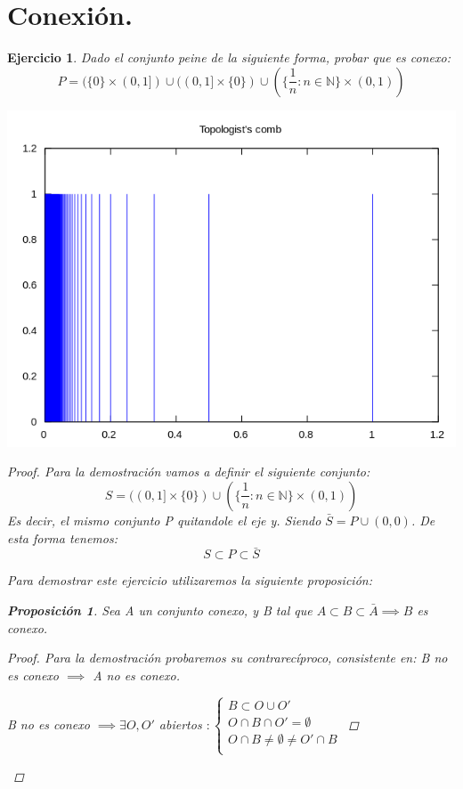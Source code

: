 \documentclass[11pt, a4paper, titlepage]{article}
\theoremstyle{exercise-style}
\newtheorem*{ejer}{Ejercicio}
\theoremstyle{theorem-style}
\newtheorem*{nprop}{Proposición}
\begin{document}
\section{Conexión.}
\begin{ejer} Dado el conjunto \emph{peine} de la siguiente forma, probar que es conexo:
\[
	P = (\{ 0\} \times (0,1]) \cup ((0,1] \times \{0\}) \cup (\{\frac{1}{n} : n \in \mathbb{N}\} \times (0,1)) 
\]

\begin{center}
\includegraphics[scale=0.4]{imagenes/peine.png}
\end{center}

\begin{proof}
Para la demostración vamos a definir el siguiente conjunto:
\[
	S = ((0,1] \times \{0\}) \cup (\{\frac{1}{n} : n \in \mathbb{N}\} \times (0,1)) 
\]
Es decir, el mismo conjunto P quitandole el eje y. Siendo $\bar{S} = P \cup (0,0)$.
De esta forma tenemos:
\[
S \subset P \subset \bar{S}
\]

Para demostrar este ejercicio utilizaremos la siguiente proposición:\\

\begin{nprop}
Sea A un conjunto conexo, y B tal que $A \subset B \subset \bar{A} \implies B$ es conexo.
\end{nprop}

\begin{proof}
 Para la demostración probaremos su contrarecíproco, consistente en: B no es conexo $\implies$ A no es conexo.
 
B no es conexo $\implies \exists O,O'$ abiertos $: \begin{cases}
B \subset O\cup O'\\
O \cap B \cap O' = \emptyset\\
O \cap B \neq \emptyset \neq O' \cap B\\
\end{cases}$
 

\end{proof}
\end{proof}
\end{ejer}
\end{document}
